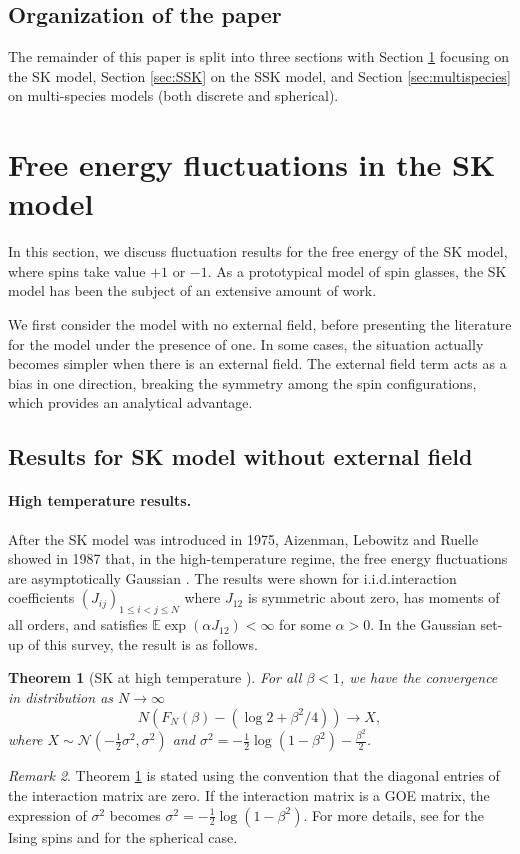 \documentclass[11pt]{article}
\numberwithin{equation}{section}
\def \a {\alpha}
\def \b {\beta}
\def \s {\sigma}
\newcommand{\bE}{\mathbb{E}}
\def \cN {\mathcal{N}}
\newtheorem{theorem}{Theorem}[section]
\theoremstyle{remark}
\newtheorem{remark}[theorem]{Remark}
\begin{document}
\subsection{Organization of the paper}
The remainder of this paper is split into three sections with Section \ref{sec:SK} focusing on the SK model, Section \ref{sec:SSK} on the SSK model, and Section \ref{sec:multispecies} on multi-species models (both discrete and spherical). 



\section{Free energy fluctuations in the SK model}\label{sec:SK}

In this section, we discuss fluctuation results for the free energy of the SK model, where spins take value $+1$ or $-1$. As a prototypical model of spin glasses, the SK model has been the subject of an extensive amount of work.

We first consider the model with no external field, before presenting the literature for the model under the presence of one. In some cases, the situation actually becomes simpler when there is an external field. The external field term acts as a bias in one direction, breaking the symmetry among the spin configurations, which provides an analytical advantage.

\subsection{Results for SK model without external field}\label{subsec:sknoext}

\paragraph{High temperature results.} After the SK model was introduced in 1975,  Aizenman, Lebowitz and Ruelle showed in 1987 that, in the high-temperature regime, the free energy fluctuations are asymptotically Gaussian \cite{AizenmanLebowitzRuelle}.
The results were shown for i.i.d.\@ interaction coefficients $(J_{ij})_{1 \leq i<j \leq N}$ where $J_{12}$ is symmetric about zero, has moments of all orders, and satisfies  $\bE \exp(\a J_{12})<\infty$ for some $\a>0$. In the Gaussian set-up of this survey, the result is as follows.
\begin{theorem}[SK at high temperature ]\label{thm:ALR}
    For all $\b<1$, we have the convergence in distribution as $N \to \infty$
    \[
    N\left(F_N(\b) - \left(\log 2 + \b^2/4\right)\right) \to X, 
    \]
    where $X \sim \cN(-\frac12 \s^2, \s^2)$ and $\s^2=-\frac12\log(1-\b^2)-\frac{\b^2}{2}$.
\end{theorem}
\begin{remark}
Theorem \ref{thm:ALR} is stated using the convention that the diagonal entries of the interaction matrix are zero. If the interaction matrix is a GOE matrix, the expression of $\s^2$ becomes $\s^2 = -\frac12\log(1-\b^2)$. For more details, see \cite{AKJ_2020} for the Ising spins and \cite{BL17} for the spherical case.
\end{remark}
\end{document}

